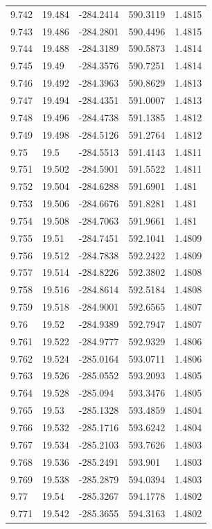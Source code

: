 \begin{tabular}{lllll}
9.742 & 19.484 & -284.2414 & 590.3119 & 1.4815 \\
9.743 & 19.486 & -284.2801 & 590.4496 & 1.4815 \\
9.744 & 19.488 & -284.3189 & 590.5873 & 1.4814 \\
9.745 & 19.49 & -284.3576 & 590.7251 & 1.4814 \\
9.746 & 19.492 & -284.3963 & 590.8629 & 1.4813 \\
9.747 & 19.494 & -284.4351 & 591.0007 & 1.4813 \\
9.748 & 19.496 & -284.4738 & 591.1385 & 1.4812 \\
9.749 & 19.498 & -284.5126 & 591.2764 & 1.4812 \\
9.75 & 19.5 & -284.5513 & 591.4143 & 1.4811 \\
9.751 & 19.502 & -284.5901 & 591.5522 & 1.4811 \\
9.752 & 19.504 & -284.6288 & 591.6901 & 1.481 \\
9.753 & 19.506 & -284.6676 & 591.8281 & 1.481 \\
9.754 & 19.508 & -284.7063 & 591.9661 & 1.481 \\
9.755 & 19.51 & -284.7451 & 592.1041 & 1.4809 \\
9.756 & 19.512 & -284.7838 & 592.2422 & 1.4809 \\
9.757 & 19.514 & -284.8226 & 592.3802 & 1.4808 \\
9.758 & 19.516 & -284.8614 & 592.5184 & 1.4808 \\
9.759 & 19.518 & -284.9001 & 592.6565 & 1.4807 \\
9.76 & 19.52 & -284.9389 & 592.7947 & 1.4807 \\
9.761 & 19.522 & -284.9777 & 592.9329 & 1.4806 \\
9.762 & 19.524 & -285.0164 & 593.0711 & 1.4806 \\
9.763 & 19.526 & -285.0552 & 593.2093 & 1.4805 \\
9.764 & 19.528 & -285.094 & 593.3476 & 1.4805 \\
9.765 & 19.53 & -285.1328 & 593.4859 & 1.4804 \\
9.766 & 19.532 & -285.1716 & 593.6242 & 1.4804 \\
9.767 & 19.534 & -285.2103 & 593.7626 & 1.4803 \\
9.768 & 19.536 & -285.2491 & 593.901 & 1.4803 \\
9.769 & 19.538 & -285.2879 & 594.0394 & 1.4803 \\
9.77 & 19.54 & -285.3267 & 594.1778 & 1.4802 \\
9.771 & 19.542 & -285.3655 & 594.3163 & 1.4802 \\

\end{tabular}
